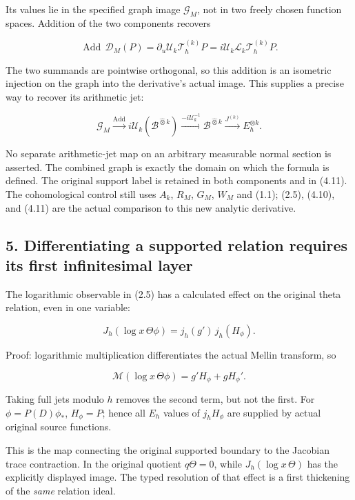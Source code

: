 \documentclass[
]{article}
\begin{document}
Its values lie in the specified graph image \(\mathscr G_M\), not in two
freely chosen function spaces. Addition of the two components recovers

\[\operatorname{Add}\,\mathscr D_M(P)=\partial_u\mathscr U_k\mathcal T_h^{(k)}P=i\mathscr U_k\mathscr L_k\mathcal T_h^{(k)}P.\tag{4.10}\]

The two summands are pointwise orthogonal, so this addition is an
isometric injection on the graph into the derivative's actual image.
This supplies a precise way to recover its arithmetic jet:

\[\mathscr G_M\xrightarrow{\operatorname{Add}}i\mathscr U_k(\mathscr B^{\widehat\otimes k})
\xrightarrow{-i\mathscr U_k^{-1}}\mathscr B^{\widehat\otimes k}\xrightarrow{J^{(k)}}E_h^{\otimes k}.\tag{4.11}\]

No separate arithmetic-jet map on an arbitrary measurable normal section
is asserted. The combined graph is exactly the domain on which the
formula is defined. The original support label is retained in both
components and in (4.11). The cohomological control still uses \(A_k\),
\(R_M\), \(G_M\), \(W_M\) and (1.1); (2.5), (4.10), and (4.11) are the
actual comparison to this new analytic derivative.

\subsection{5. Differentiating a supported relation requires its first
infinitesimal
layer}\label{differentiating-a-supported-relation-requires-its-first-infinitesimal-layer}

The logarithmic observable in (2.5) has a calculated effect on the
original theta relation, even in one variable:

\[\boxed{J_h(\log x\,\Theta\phi)=j_h(g')\,j_h(H_\phi).}\tag{5.1}\]

Proof: logarithmic multiplication differentiates the actual Mellin
transform, so

\[\mathcal M(\log x\,\Theta\phi)=g'H_\phi+gH_\phi'.\]

Taking full jets modulo \(h\) removes the second term, but not the
first. For \(\phi=P(D)\phi_*\), \(H_\phi=P\); hence all \(E_h\) values
of \(j_hH_\phi\) are supplied by actual original source functions.

This is the map connecting the original supported boundary to the
Jacobian trace contraction. In the original quotient \(q\Theta=0\),
while \(J_h(\log x\,\Theta)\) has the explicitly displayed image. The
typed resolution of that effect is a first thickening of the \emph{same}
relation ideal.
\end{document}
